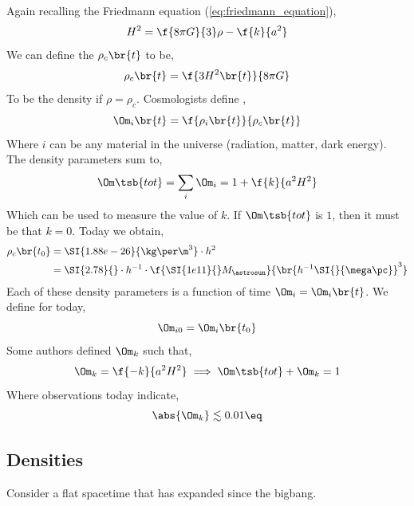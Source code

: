 \documentclass{article}
\begin{document}
Again recalling the Friedmann equation (\cref{eq:friedmann_equation}),
\[ H^2 = \f{8 \pi G}{3}\rho - \f{k}{a^2} \]
We can define the  $\rho_{c}\br{t}$ to be,
\[ \rho_{c}\br{t} = \f{3 H^2\br{t}}{8 \pi G} \]
To be the density if $\rho = \rho_c$. Cosmologists define ,
\[ \Om_i \br{t} = \f{\rho_i\br{t}}{\rho_c\br{t}} \]
Where $i$ can be any material in the universe (radiation, matter, dark energy). The density parameters sum to,
\[ \Om\tsb{tot} = \sum_{i} \Om_i = 1 + \f{k}{a^2 H^2} \]
Which can be used to measure the value of $k$. If $\Om\tsb{tot}$ is $1$, then it must be that $k = 0$. Today we obtain,
\begin{align*}
    \rho_c\br{t_0}
    &= \SI{1.88e-26}{\kg \per \m^3} \cdot h^2\\
    &= \SI{2.78}{} \cdot h^{-1} \cdot \f{\SI{1e11}{} M_{\astrosun}}{\br{h^{-1} \SI{}{\mega\pc}}^3}
\end{align*}
Each of these density parameters is a function of time $\Om_i = \Om_i\br{t}$. We define for today,
\[ \Om_{i0} = \Om_i\br{t_0} \]
Some authors defined $\Om_k$ such that,
\[ \Om_k = \f{-k}{a^2 H^2} \implies \Om\tsb{tot} + \Om_k = 1 \]
Where observations today indicate,
\[ \abs{\Om_k} \lesssim 0.01 \eq \label{eq:k_om} \]
\subsection{Densities}
Consider a flat spacetime that has expanded since the bigbang.

\begin{center}
\end{center}
\end{document}
